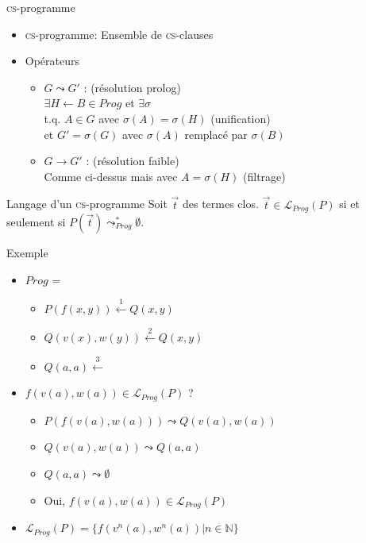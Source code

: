 \documentclass[xcolor={dvipsnames}]{beamer}
\newcommand{\csprogramme}{\textsc{cs}-programme\xspace}
\newcommand{\csclauses}{\textsc{cs}-clauses\xspace}
\begin{document}
\begin{frame}{\csprogramme}
  \begin{itemize}[<+->]
  \item \csprogramme : Ensemble de \csclauses
  \item Opérateurs
    \begin{itemize}
    \item $G \leadsto G'$ : (résolution prolog) \\
      $\exists H \leftarrow B \in Prog$ et $\exists \sigma$ \\
      t.q. $A \in G$ avec $\sigma(A) = \sigma(H)$ (unification)\\
      et $G' = \sigma(G)$ avec $\sigma(A)$ remplacé par $\sigma(B)$
    \item $G \rightarrow G'$ : (résolution faible) \\
      Comme ci-dessus mais avec $A = \sigma(H)$ (filtrage)
    \end{itemize}
  \end{itemize}
  \begin{block}{Langage d'un \csprogramme}
    Soit $\vec{t}$ des termes clos.
    $\vec{t} \in \mathcal{L}_{Prog}(P)$ si et seulement si $P(\vec{t}) \leadsto^*_{Prog} \emptyset$.
  \end{block}
\end{frame}

\begin{frame}{Exemple}
  \begin{itemize}[<+->]
  \item $Prog$ =
    \begin{itemize}
    \item {}$P(f(x,y)) \stackrel{1}{\leftarrow} Q(x, y)$ \\
    \item {}$Q(v(x), w(y)) \stackrel{2}{\leftarrow} Q(x, y)$ \\
    \item {}$Q(a, a) \stackrel{3}{\leftarrow} $
    \end{itemize}
  \item $f(v(a),w(a)) \in \mathcal{L}_{Prog}(P)$ ?
    \begin{itemize}
    \item $P(f(v(a),w(a))) \leadsto Q(v(a), w(a))$ \\
    \item $Q(v(a), w(a)) \leadsto Q(a, a)$ \\
    \item $Q(a, a) \leadsto \emptyset$
    \item Oui, $f(v(a),w(a)) \in \mathcal{L}_{Prog}(P)$
    \end{itemize}
  \item $\mathcal{L}_{Prog}(P) = \{f(v^n(a),w^n(a)) | n \in \mathbb{N}\}$
  \end{itemize}
\end{frame}
\end{document}
